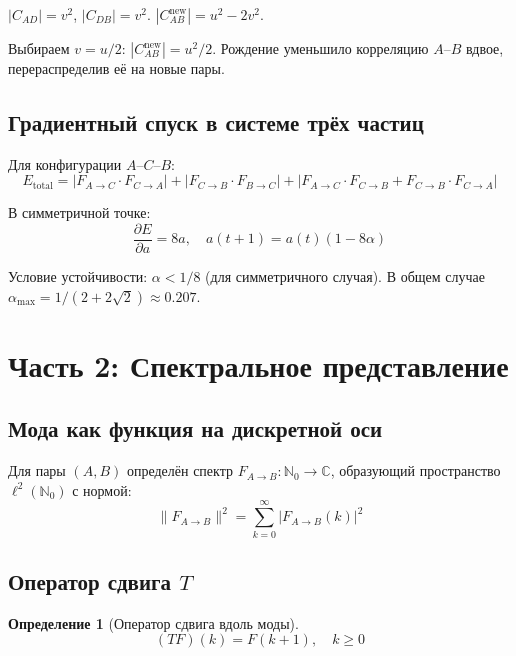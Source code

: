 \documentclass[11pt,a4paper]{article}
\newtheorem{definition}{Определение}[section]
\theoremstyle{definition}
\begin{document}
$|C_{AD}| = v^2$, $|C_{DB}| = v^2$.
$|C_{AB}^{\text{new}}| = u^2 - 2v^2$.

Выбираем $v = u/2$: $|C_{AB}^{\text{new}}| = u^2/2$. Рождение уменьшило корреляцию $A$--$B$ вдвое, перераспределив её на новые пары.

\subsection{Градиентный спуск в системе трёх частиц}

Для конфигурации $A$--$C$--$B$:
\begin{equation}
    E_{\text{total}} = |F_{A \to C} \cdot F_{C \to A}| + |F_{C \to B} \cdot F_{B \to C}| + |F_{A \to C} \cdot F_{C \to B} + F_{C \to B} \cdot F_{C \to A}|
\end{equation}

В симметричной точке:
\begin{equation}
    \frac{\partial E}{\partial a} = 8a, \quad a(t+1) = a(t)(1 - 8\alpha)
\end{equation}

Условие устойчивости: $\alpha < 1/8$ (для симметричного случая). В общем случае $\alpha_{\max} = 1 / (2 + 2\sqrt{2}) \approx 0.207$.

\newpage
\section{Часть 2: Спектральное представление}

\subsection{Мода как функция на дискретной оси}

Для пары $(A, B)$ определён спектр $F_{A \to B} : \mathbb{N}_0 \to \mathbb{C}$, образующий пространство $\ell^2(\mathbb{N}_0)$ с нормой:
\begin{equation}
    \|F_{A \to B}\|^2 = \sum_{k=0}^{\infty} |F_{A \to B}(k)|^2
\end{equation}

\subsection{Оператор сдвига $T$}

\begin{definition}[Оператор сдвига вдоль моды]
\begin{equation}
    (T F)(k) = F(k+1), \quad k \geq 0
\end{equation}
\end{definition}
\end{document}
